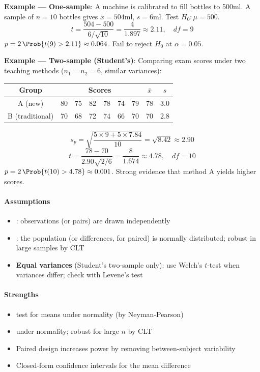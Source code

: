 \textbf{Example — One-sample}: A machine is calibrated to fill bottles to 500ml.
A sample of $n=10$ bottles gives $\overline{x}=504$ml, $s=6$ml. Test $H_0: \mu=500$.
$$t = \frac{504-500}{6/\sqrt{10}} = \frac{4}{1.897} \approx 2.11, \quad df=9$$
$p = 2\,\Prob{t(9)>2.11} \approx 0.064$. Fail to reject $H_0$ at $\alpha=0.05$.

\textbf{Example — Two-sample (Student's)}: Comparing exam scores under two teaching
methods ($n_1=n_2=6$, similar variances):

\begin{center}
\begin{tabular}{|c|cccccc|c|c|}
    \hline
    \textbf{Group} & \multicolumn{6}{c|}{\textbf{Scores}} & $\overline{x}$ & $s$ \\
    \hline
    A (new)         & 80 & 75 & 82 & 78 & 74 & 79 & 78 & 3.0 \\
    B (traditional) & 70 & 68 & 72 & 74 & 66 & 70 & 70 & 2.8 \\
    \hline
\end{tabular}
\end{center}

$$s_p = \sqrt{\frac{5\times9+5\times7.84}{10}} = \sqrt{8.42} \approx 2.90$$
$$t = \frac{78-70}{2.90\sqrt{2/6}} = \frac{8}{1.674} \approx 4.78, \quad df=10$$
$p = 2\,\Prob{t(10)>4.78} \approx 0.001$. Strong evidence that method A yields higher
scores.

\paragraph{Assumptions}
\begin{itemize}
    \item {}: observations (or pairs) are drawn independently
    \item {}: the population (or differences, for paired) is normally
        distributed; robust in large samples by CLT
    \item \textbf{Equal variances} (Student's two-sample only): use Welch's $t$-test
        when variances differ; check with Levene's test
\end{itemize}

\paragraph{Strengths}
\begin{itemize}
    \item {} test for means under normality (by Neyman-Pearson)
    \item {} under normality; robust for large $n$ by CLT
    \item Paired design increases power by removing between-subject variability
    \item Closed-form confidence intervals for the mean difference
\end{itemize}

